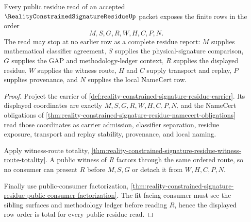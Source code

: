 \begin{theorem}
\label{thm:reality-constrained-signature-residue-row-order-totality}
Every public residue read of an accepted $\RealityConstrainedSignatureResidueUp$
packet exposes the finite rows in the order
$$
M,S,G,R,W,H,C,P,N.
$$
The read may stop at no earlier row as a complete residue report: $M$ supplies
mathematical classifier agreement, $S$ supplies the physical-signature
comparison, $G$ supplies the GAP and methodology-ledger context, $R$ supplies the
displayed residue, $W$ supplies the witness route, $H$ and $C$ supply transport
and replay, $P$ supplies provenance, and $N$ supplies the local NameCert row.
\end{theorem}
\begin{proof}
Project the carrier of
\autoref{def:reality-constrained-signature-residue-carrier}. Its displayed
coordinates are exactly $M,S,G,R,W,H,C,P,N$, and the NameCert obligations of
\autoref{thm:reality-constrained-signature-residue-namecert-obligations} read
those coordinates as carrier admission, classifier separation, residue exposure,
transport and replay stability, provenance, and local naming.

Apply witness-route totality,
\autoref{thm:reality-constrained-signature-residue-witness-route-totality}. A
public witness of $R$ factors through the same ordered route, so no consumer can
present $R$ before $M,S,G$ or detach it from $W,H,C,P,N$.

Finally use public-consumer factorization,
\autoref{thm:reality-constrained-signature-residue-public-consumer-factorization}.
The fit-facing consumer must see the sibling surfaces and methodology ledger
before reading $R$, hence the displayed row order is total for every public
residue read.
\end{proof}

